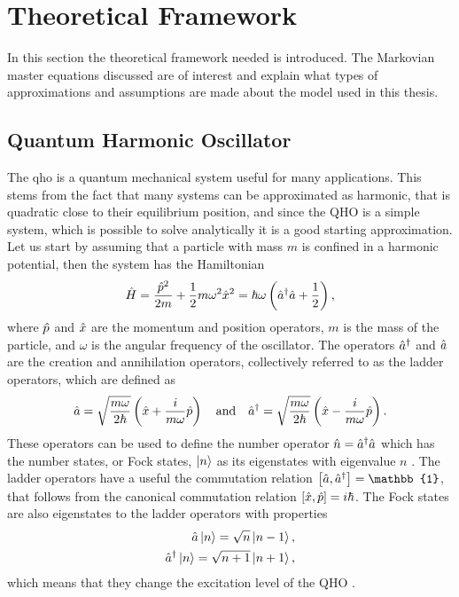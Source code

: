 \section{Theoretical Framework}
In this section the theoretical framework needed is introduced. The Markovian master equations discussed are of interest and explain what types of approximations and assumptions are made about the model used in this thesis. 
\subsection{Quantum Harmonic Oscillator} \label{sec:qho}
The \gls{qho} is a quantum mechanical system useful for many applications. This stems from the fact that many systems can be approximated as harmonic, that is quadratic close to their equilibrium position, and since the QHO is a simple system, which is possible to solve analytically it is a good starting approximation. Let us start by assuming that a particle with mass $m$ is confined in a harmonic potential, then the system has the Hamiltonian
\begin{equation}
    \hat{H} = \frac{\hat{p}^2}{2m} + \frac{1}{2}m\omega^2\hat{x}^2 = \hbar\omega\left(\hat{a}^{\dagger}\hat{a} + \frac{1}{2}\right), \label{eq:hamiltonian}
\end{equation}
where $\hat{p}$ and $\hat{x}$ are the momentum and position operators, $m$ is the mass of the particle, and $\omega$ is the angular frequency of the oscillator. The operators $\hat{a}^{\dagger}$ and $\hat{a}$ are the creation and annihilation operators, collectively referred to as the ladder operators, which are defined as
\begin{equation}
    \hat{a} = \sqrt{\frac{m\omega}{2\hbar}} \left(\hat{x} + \frac{i}{m\omega} \hat{p}\right) \quad \text{and} \quad \hat{a}^{\dagger} = \sqrt{\frac{m\omega}{2\hbar}} \left(\hat{x} - \frac{i}{m\omega} \hat{p}\right).
\end{equation}
These operators can be used to define the number operator $\hat{n} = \hat{a}^{\dagger}\hat{a}$ which has the number states, or Fock states, $\ket{n}$ as its eigenstates with eigenvalue $n$ \cite{Meystre:2021}. The ladder operators have a useful the commutation relation $\comm{\a}{\ad} = \mathbb{1}$, that follows from the canonical commutation relation $\comm{\xop}{\pop} = i\hbar$. The Fock states are also eigenstates to the ladder operators with properties
\begin{align}
    \hat{a} \ket{n} = \sqrt{n} \ket{n-1},\\
    \hat{a}^{\dagger} \ket{n} = \sqrt{n+1} \ket{n+1},
\end{align}
which means that they change the excitation level of the QHO \cite{Meystre:2021}.

